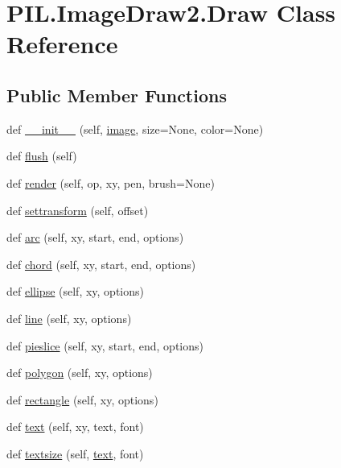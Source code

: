 \hypertarget{classPIL_1_1ImageDraw2_1_1Draw}{}\section{P\+I\+L.\+Image\+Draw2.\+Draw Class Reference}
\label{classPIL_1_1ImageDraw2_1_1Draw}
\subsection*{Public Member Functions}
\begin{DoxyCompactItemize}
\item 
def \hyperlink{classPIL_1_1ImageDraw2_1_1Draw_adcf0c3ed78b06b5bc8581af3cc9e7592}{\+\_\+\+\_\+init\+\_\+\+\_\+} (self, \hyperlink{classPIL_1_1ImageDraw2_1_1Draw_a800176ea2a5efe96d9e96efb83f1aa73}{image}, size=None, color=None)
\item 
def \hyperlink{classPIL_1_1ImageDraw2_1_1Draw_a6473f1f92729fbd29c4193e3c3f3e2af}{flush} (self)
\item 
def \hyperlink{classPIL_1_1ImageDraw2_1_1Draw_aa9077da45dc5e9d9d817a603e50f8b06}{render} (self, op, xy, pen, brush=None)
\item 
def \hyperlink{classPIL_1_1ImageDraw2_1_1Draw_a7dd6147e3165ff73c42733c50bd47be7}{settransform} (self, offset)
\item 
def \hyperlink{classPIL_1_1ImageDraw2_1_1Draw_a807aafe7a641f7abfea1733f31fe5427}{arc} (self, xy, start, end, options)
\item 
def \hyperlink{classPIL_1_1ImageDraw2_1_1Draw_ab042f3845a6707d8b5f5092e9a8d2e67}{chord} (self, xy, start, end, options)
\item 
def \hyperlink{classPIL_1_1ImageDraw2_1_1Draw_a1831fa5e00aba64850e37634c1033f4e}{ellipse} (self, xy, options)
\item 
def \hyperlink{classPIL_1_1ImageDraw2_1_1Draw_a80cc6dd96f10150df186a304b01acf30}{line} (self, xy, options)
\item 
def \hyperlink{classPIL_1_1ImageDraw2_1_1Draw_a6ef3c84a11a4be6fd0297b4a8a4d1369}{pieslice} (self, xy, start, end, options)
\item 
def \hyperlink{classPIL_1_1ImageDraw2_1_1Draw_aeba64001c9072a9afc063d3a91e4b78f}{polygon} (self, xy, options)
\item 
def \hyperlink{classPIL_1_1ImageDraw2_1_1Draw_a284be47c2d1623b0f2b00c12bb6d33eb}{rectangle} (self, xy, options)
\item 
def \hyperlink{classPIL_1_1ImageDraw2_1_1Draw_a7a155b78e357646daa71d9ffe28eda95}{text} (self, xy, text, font)
\item 
def \hyperlink{classPIL_1_1ImageDraw2_1_1Draw_acdf30844b7017941ba05999638e3ab65}{textsize} (self, \hyperlink{classPIL_1_1ImageDraw2_1_1Draw_a7a155b78e357646daa71d9ffe28eda95}{text}, font)
\end{DoxyCompactItemize}
